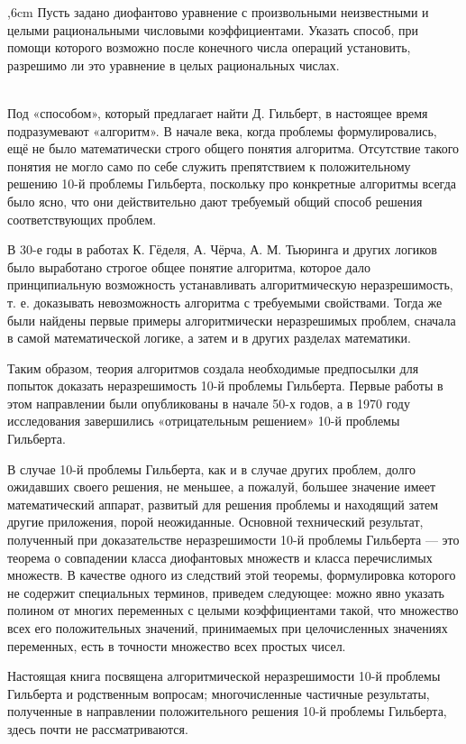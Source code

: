 \documentclass[12pt, a4paper, openany]{book}
\begin{document}
,6cm  {\small Пусть задано диофантово уравнение с произвольными неизвестными и целыми рациональными числовыми коэффициентами.  Указать способ, при помощи которого возможно после конечного  числа операций установить, разрешимо ли это уравнение в целых  рациональных числах. }

\ \\

Под «способом», который предлагает найти Д. Гильберт, в настоящее время подразумевают «алгоритм». В начале века, когда проблемы формулировались, ещё не было математически строго общего понятия алгоритма. Отсутствие такого понятия  не могло само по себе служить препятствием к положительному решению 10-й проблемы Гильберта, поскольку про конкретные алгоритмы всегда было ясно, что они действительно дают требуемый общий способ решения соответствующих проблем. 

В 30-е годы в работах К. Гёделя, А. Чёрча, А. М. Тьюринга и других логиков было выработано строгое общее понятие алгоритма, которое дало принципиальную возможность устанавливать алгоритмическую неразрешимость, т. е. доказывать невозможность алгоритма с требуемыми свойствами. Тогда же были найдены первые примеры алгоритмически неразрешимых проблем, сначала в самой математической логике, а затем и в других разделах математики. 

Таким образом, теория алгоритмов создала необходимые предпосылки для попыток доказать неразрешимость 10-й проблемы Гильберта. Первые работы в этом направлении были опубликованы в начале 50-х годов, а в 1970 году исследования завершились «отрицательным решением» 10-й проблемы Гильберта. 

В случае 10-й проблемы Гильберта, как и в случае других проблем, долго ожидавших своего решения, не меньшее, а пожалуй, большее значение имеет математический аппарат, развитый для решения проблемы и находящий затем другие приложения, порой неожиданные. Основной технический результат, полученный при доказательстве неразрешимости 10-й проблемы Гильберта — это теорема о совпадении класса диофантовых множеств и класса перечислимых множеств. В качестве одного из следствий этой теоремы, формулировка которого не содержит специальных терминов, приведем следующее: можно явно указать полином от многих переменных с целыми коэффициентами такой, что множество всех его положительных значений, принимаемых при целочисленных значениях переменных, есть в точности множество всех простых чисел. 

Настоящая книга посвящена алгоритмической неразрешимости 10-й проблемы Гильберта и родственным вопросам; многочисленные частичные результаты, полученные в направлении положительного решения 10-й проблемы Гильберта, здесь почти не рассматриваются. 
\end{document}
